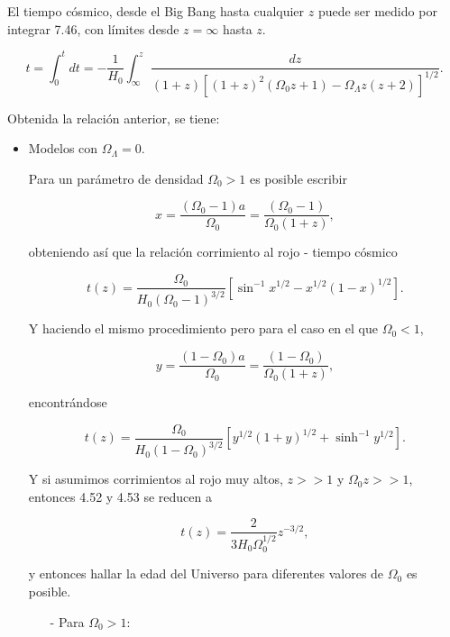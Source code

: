 \documentclass[11pt]{article}
\begin{document}
    El tiempo cósmico, desde el Big Bang hasta cualquier $z$ puede ser medido por integrar 7.46, con límites desde $z = \infty$ hasta $z$. 

    \begin{equation}
	    t = \int_0^t{dt} = - \frac{1}{H_0} \int_{\infty}^z{\frac{dz}{  (1+z)[(1+z)^2 (\Omega_0 z + 1) - \Omega_{\Lambda} z (z+2) ]^{1/2}}.} 
	\end{equation}


    Obtenida la relación anterior, se tiene:

        \begin{itemize}
	        \item Modelos con $\Omega_{\Lambda}=0$. 

		Para un parámetro de densidad $\Omega_0 >1$ es posible escribir 

		$$ 
		x = \frac{(\Omega_0-1)a}{\Omega_0} = \frac{(\Omega_0-1)}{\Omega_0 (1+z)} , 		
		$$
		
		obteniendo así que la relación corrimiento al rojo -  tiempo cósmico 

		\begin{equation}
			t(z) = \frac{\Omega_0}{H_0( \Omega_0 - 1)^{3/2}}[\sin^{-1} x^{1/2} - x^{1/2} (1-x)^{1/2}].
		\end{equation}
		
		Y haciendo el mismo procedimiento pero para el caso en el que $\Omega_0 < 1$,

	    $$
	    y = \frac{(1- \Omega_0)a}{\Omega_0} = \frac{(1-\Omega_0)}{\Omega_0 (1+z)},
	    $$

    encontrándose

    \begin{equation}
	    t(z) = \frac{\Omega_0}{H_0(1 - \Omega_0)^{3/2}}[ y^{1/2} (1+y)^{1/2} + \sinh^{-1} y^{1/2}].
    \end{equation}
    
    Y si asumimos corrimientos al rojo muy altos, $z>>1$ y $\Omega_0 z >>1$, entonces 4.52 y 4.53 se reducen a 

    \begin{equation}
        t(z) = \frac{2}{3H_0 \Omega_0^{1/2}} z^{-3/2},
    \end{equation}
		
		
		y entonces hallar la edad del Universo para diferentes valores de $\Omega_0$ es posible. 

        \begin{itemize}

            \item[-] Para $\Omega_0>1$:


\end{itemize}
\end{itemize}
\end{document}
